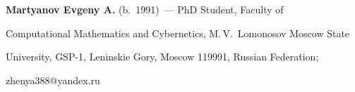 \vspace*{-2pt}





\noindent


\textbf{Martyanov Evgeny A.} (b.\ 1991)~--- PhD Student, Faculty of 


Computational Mathematics and Cybernetics, M.\,V.~Lomonosov Moscow State 


University, \mbox{GSP-1}, Leninskie Gory, Moscow 119991, Russian Federation; 


\mbox{zhenya388@yandex.ru}


    


\label{end\stat}








\renewcommand{\bibname}{\protect\rm Литература}


 


 


 


 


